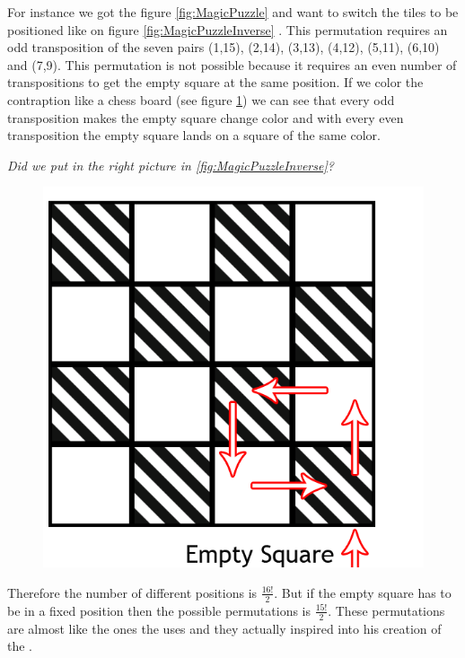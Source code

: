 For instance we got the figure \ref{fig:MagicPuzzle} and want to switch the tiles to be positioned like on figure \ref{fig:MagicPuzzleInverse} \cite[pp. 48-50]{Larsen81}. This permutation requires an odd transposition of the seven pairs (1,15), (2,14), (3,13), (4,12), (5,11), (6,10) and (7,9). This permutation is not possible because it requires an even number of transpositions to get the empty square at the same position. If we color the contraption like a chess board (see figure \ref{fig:Chess}) we can see that every odd transposition makes the empty square change color and with every even transposition the empty square lands on a square of the same color.

\textit{Did we put in the right picture in \ref{fig:MagicPuzzleInverse}?}

\begin{figure}[!h]
\begin{center}
\includegraphics[scale=0.2]{input/pics/MagicPuzzle(EmptySquare).png}
\caption{}
\label{fig:Chess}
\end{center}
\end{figure}

Therefore the number of different positions is $\frac{16!}{2}$. But if the empty square has to be in a fixed position then the possible permutations is $\frac{15!}{2}$. These permutations are almost like the ones the \rubik{} uses and they actually inspired \erno{} into his creation of the \rubik{} \cite[pp. 7-9]{Rubik87}.